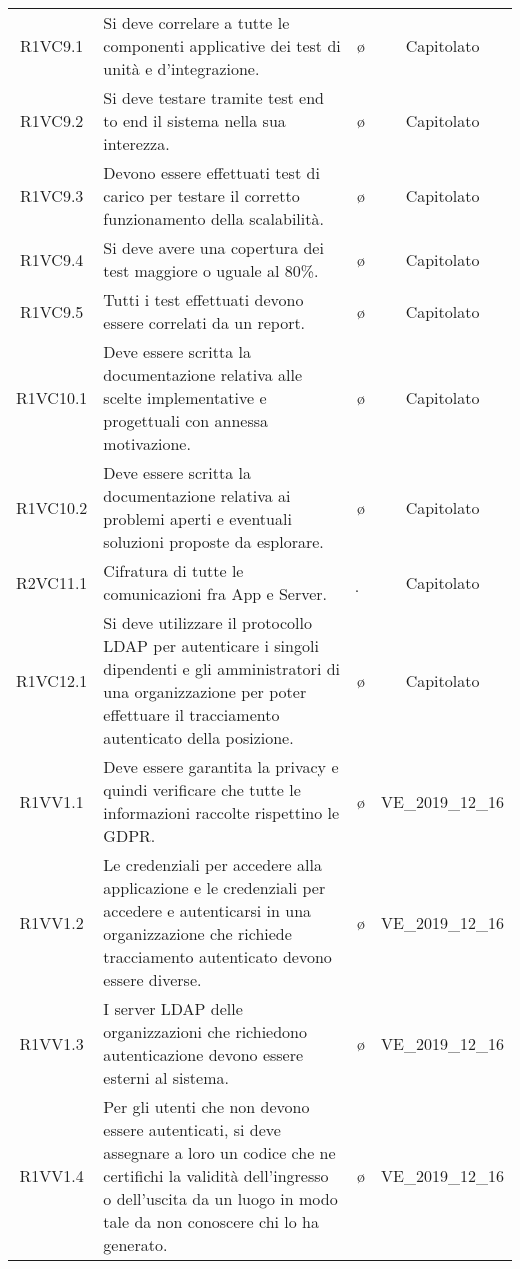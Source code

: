 {\begin{longtable}{ c C{6.5cm} c c}
R1VC9.1 & Si deve correlare a tutte le componenti applicative dei test di unità e d’integrazione. & \o & Capitolato \\
R1VC9.2 & Si deve testare tramite test end to end il sistema nella sua interezza. & \o & Capitolato \\
R1VC9.3 & Devono essere effettuati test di carico per testare il corretto funzionamento della scalabilità. & \o & Capitolato \\
R1VC9.4 & Si deve avere una copertura dei test maggiore o uguale al 80\%. & \o & Capitolato \\
R1VC9.5 & Tutti i test effettuati devono essere correlati da un report. & \o & Capitolato \\
R1VC10.1 & Deve essere scritta la documentazione relativa alle scelte implementative e progettuali con annessa motivazione. & \o & Capitolato \\
R1VC10.2 & Deve essere scritta la documentazione relativa ai problemi aperti e eventuali soluzioni proposte da esplorare. & \o & Capitolato \\
R2VC11.1 & Cifratura di tutte le comunicazioni fra App e Server. & \d & Capitolato  \\
R1VC12.1 & Si deve utilizzare il protocollo LDAP per autenticare i singoli dipendenti e gli amministratori di una organizzazione per poter effettuare il tracciamento autenticato della posizione. & \o & Capitolato \\	
R1VV1.1 & Deve essere garantita la privacy e quindi verificare che tutte le informazioni raccolte rispettino le GDPR. & \o & VE\_2019\_12\_16 \\
R1VV1.2 & Le credenziali per accedere alla applicazione e le credenziali per accedere e autenticarsi in una organizzazione che richiede tracciamento autenticato devono essere diverse. & \o & VE\_2019\_12\_16 \\
R1VV1.3 & I server LDAP delle organizzazioni che richiedono autenticazione devono essere esterni al sistema.  & \o & VE\_2019\_12\_16 \\
R1VV1.4 & Per gli utenti che non devono essere autenticati, si deve assegnare a loro un codice che ne certifichi la validità dell’ingresso o dell'uscita da un luogo in modo tale da non conoscere chi lo ha generato. & \o & VE\_2019\_12\_16 \\
\end{longtable}
}